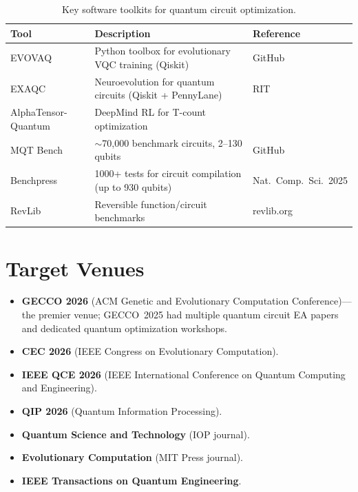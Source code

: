 \documentclass[11pt]{article}
\begin{document}
\begin{table}[h]
\centering
\begin{tabular}{p{3.5cm} p{7cm} p{3.5cm}}
\toprule
\textbf{Tool} & \textbf{Description} & \textbf{Reference} \\
\midrule
EVOVAQ & Python toolbox for evolutionary VQC training (Qiskit) & GitHub \\
EXAQC & Neuroevolution for quantum circuits (Qiskit + PennyLane) & RIT \\
AlphaTensor-Quantum & DeepMind RL for T-count optimization & \cite{alphatensor2025} \\
MQT Bench & ${\sim}$70,000 benchmark circuits, 2--130 qubits & GitHub \\
Benchpress & 1000+ tests for circuit compilation (up to 930 qubits) & Nat.\ Comp.\ Sci.\ 2025 \\
RevLib & Reversible function/circuit benchmarks & revlib.org \\
\bottomrule
\end{tabular}
\caption{Key software toolkits for quantum circuit optimization.}
\label{tab:tools}
\end{table}

\section{Target Venues}
\label{sec:venues}

\begin{itemize}
    \item \textbf{GECCO 2026} (ACM Genetic and Evolutionary Computation Conference)---the premier venue; GECCO~2025 had multiple quantum circuit EA papers and dedicated quantum optimization workshops.
    \item \textbf{CEC 2026} (IEEE Congress on Evolutionary Computation).
    \item \textbf{IEEE QCE 2026} (IEEE International Conference on Quantum Computing and Engineering).
    \item \textbf{QIP 2026} (Quantum Information Processing).
    \item \textbf{Quantum Science and Technology} (IOP journal).
    \item \textbf{Evolutionary Computation} (MIT Press journal).
    \item \textbf{IEEE Transactions on Quantum Engineering}.
\end{itemize}
\end{document}

